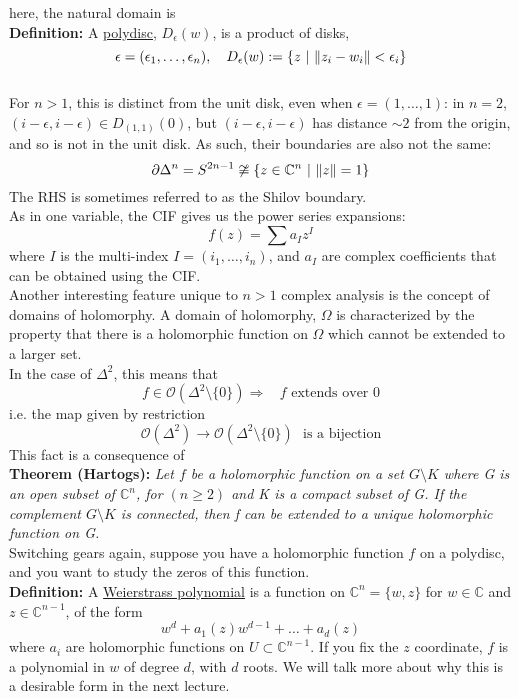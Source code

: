 \documentclass[12pt]{report}
\theoremstyle{definition}
\theoremstyle{remark}
\numberwithin{equation}{section}
\theoremstyle{definition}
\newcommand{\bb}[1]{\mathbb{#1}}
\DeclarePairedDelimiter\norm{\lVert}{\rVert}%
\begin{document}
here, the natural domain is\\
\textbf{Definition: }A \underline{polydisc}, $D_\epsilon(w)$, is a product of disks,
$$
	\epsilon = (\epsilon_1,\dots,\epsilon_n),\ \ \ D_\epsilon(w) := \{z\ |\ \norm{z_i-w_i}< \epsilon_i\}
$$
\\
For $n > 1$, this is distinct from the unit disk, even when $\epsilon = (1,\dots,1)$: in $n = 2$, $(i-\epsilon,i-\epsilon) \in D_{(1,1)}(0)$, but $(i-\epsilon,i-\epsilon)$ has distance $\sim 2$ from the origin, and so is not in the unit disk. As such, their boundaries are also not the same: 
$$
	\partial\Delta^n = S^{2n-1} \not \cong \{z\in \bb C^n\ |\ \norm{z} = 1\}
$$
The RHS is sometimes referred to as the Shilov boundary. \\
As in one variable, the CIF gives us the power series expansions:
$$
	f(z) = \sum a_I z^I
$$
where $I$ is the multi-index $I = (i_1,\dots,i_n)$, and $a_I$ are complex coefficients that can be obtained using the CIF. \\
Another interesting feature unique to $n > 1$ complex analysis is the concept of domains of holomorphy. A domain of holomorphy, $\Omega$ is characterized by the property that there is a holomorphic function on $\Omega$ which cannot be extended to a larger set. \\
In the case of $\Delta^2$, this means that 
$$
	f\in \mathcal{O}(\Delta^2 \text{\textbackslash}\{0\}) \Rightarrow \ \ \ \ f \text{ extends over } 0
$$
i.e. the map given by restriction 
$$
	\mathcal{O}(\Delta^2) \to \mathcal{O}(\Delta^2 \text{\textbackslash} \{0\})\ \ \ \text{is a bijection}
$$
This fact is a consequence of \\
\textbf{Theorem (Hartogs): }\textit{Let $f$ be a holomorphic function on a set $G\setminus K$ where G is an open subset of $\bb C^n$, for $(n \geq 2)$ and K is a compact subset of G. If the complement $G \setminus K$ is connected, then f can be extended to a unique holomorphic function on G.}\\
Switching gears again, suppose you have a holomorphic function $f$ on a polydisc, and you want to study the zeros of this function. \\
\textbf{Definition: }A \underline{Weierstrass polynomial} is a function on $\bb C^n = \{w, z\}$ for $w \in \bb C$ and $z \in \bb C^{n-1}$, of the form 
$$
	w^d + a_1(z)w^{d-1} + \dots + a_d(z) 
$$
where $a_i$ are holomorphic functions on $U \subset \bb C^{n-1}$. If you fix the $z$ coordinate, $f$ is a polynomial in $w$ of degree $d$, with $d$ roots. We will talk more about why this is a desirable form in the next lecture. 
\end{document}
